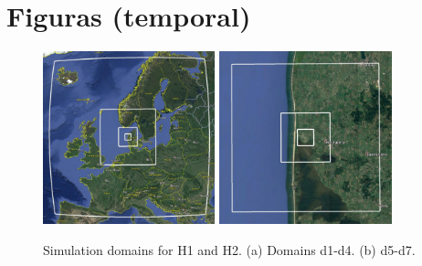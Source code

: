\section*{Figuras (temporal)}
\begin{figure}[H]
	\centering
	
	\includegraphics[height=5cm,trim={5mm 3mm 3mm 3mm},clip,frame]{Imagenes/05/hov_dom1_edit.jpg}
	\includegraphics[height=5cm,trim={5mm 3mm 3mm 3mm},clip,frame]{Imagenes/05/hov_dom2_edit.jpg}%
	
	\caption{Simulation domains for H1 and H2. (a) Domains d1-d4. (b) d5-d7.}
	\label{fig:05_dom_hov}
\end{figure}

%	

